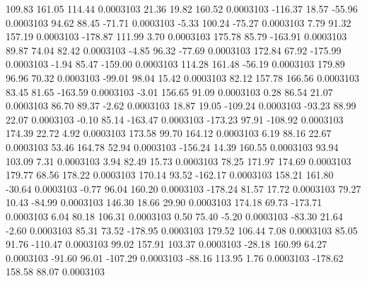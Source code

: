       109.83      161.05      114.44     0.0003103
       21.36       19.82      160.52     0.0003103
     -116.37       18.57      -55.96     0.0003103
       94.62       88.45      -71.71     0.0003103
       -5.33      100.24      -75.27     0.0003103
        7.79       91.32      157.19     0.0003103
     -178.87      111.99        3.70     0.0003103
      175.78       85.79     -163.91     0.0003103
       89.87       74.04       82.42     0.0003103
       -4.85       96.32      -77.69     0.0003103
      172.84       67.92     -175.99     0.0003103
       -1.94       85.47     -159.00     0.0003103
      114.28      161.48      -56.19     0.0003103
      179.89       96.96       70.32     0.0003103
      -99.01       98.04       15.42     0.0003103
       82.12      157.78      166.56     0.0003103
       83.45       81.65     -163.59     0.0003103
       -3.01      156.65       91.09     0.0003103
        0.28       86.54       21.07     0.0003103
       86.70       89.37       -2.62     0.0003103
       18.87       19.05     -109.24     0.0003103
      -93.23       88.99       22.07     0.0003103
       -0.10       85.14     -163.47     0.0003103
     -173.23       97.91     -108.92     0.0003103
      174.39       22.72        4.92     0.0003103
      173.58       99.70      164.12     0.0003103
        6.19       88.16       22.67     0.0003103
       53.46      164.78       52.94     0.0003103
     -156.24       14.39      160.55     0.0003103
       93.94      103.09        7.31     0.0003103
        3.94       82.49       15.73     0.0003103
       78.25      171.97      174.69     0.0003103
      179.77       68.56      178.22     0.0003103
      170.14       93.52     -162.17     0.0003103
      158.21      161.80      -30.64     0.0003103
       -0.77       96.04      160.20     0.0003103
     -178.24       81.57       17.72     0.0003103
       79.27       10.43      -84.99     0.0003103
      146.30       18.66       29.90     0.0003103
      174.18       69.73     -173.71     0.0003103
        6.04       80.18      106.31     0.0003103
        0.50       75.40       -5.20     0.0003103
      -83.30       21.64       -2.60     0.0003103
       85.31       73.52     -178.95     0.0003103
      179.52      106.44        7.08     0.0003103
       85.05       91.76     -110.47     0.0003103
       99.02      157.91      103.37     0.0003103
      -28.18      160.99       64.27     0.0003103
      -91.60       96.01     -107.29     0.0003103
      -88.16      113.95        1.76     0.0003103
     -178.62      158.58       88.07     0.0003103
